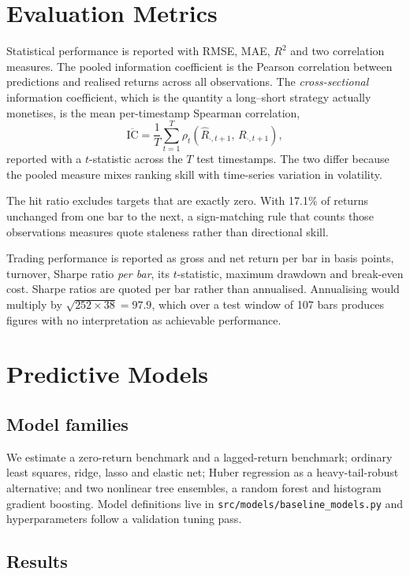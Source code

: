 \documentclass[11pt]{article}
\begin{document}
\section{Evaluation Metrics}
\label{sec:metrics}

Statistical performance is reported with RMSE, MAE, $R^2$ and two correlation
measures. The pooled information coefficient is the Pearson correlation between
predictions and realised returns across all observations. The
\emph{cross-sectional} information coefficient, which is the quantity a
long--short strategy actually monetises, is the mean per-timestamp Spearman
correlation,
\[
\overline{\mathrm{IC}} = \frac{1}{T}\sum_{t=1}^{T}
\rho_t\!\left(\widehat R_{\cdot,t+1},\, R_{\cdot,t+1}\right),
\]
reported with a $t$-statistic across the $T$ test timestamps. The two differ
because the pooled measure mixes ranking skill with time-series variation in
volatility.

The hit ratio excludes targets that are exactly zero. With 17.1\% of
returns unchanged from one bar to the next, a sign-matching rule that counts
those observations measures quote staleness rather than directional skill.

Trading performance is reported as gross and net return per bar in basis
points, turnover, Sharpe ratio \emph{per bar}, its $t$-statistic, maximum
drawdown and break-even cost. Sharpe ratios are quoted per bar rather than
annualised. Annualising would multiply by $\sqrt{252 \times 38} = 97.9$, which
over a test window of 107 bars produces figures with no
interpretation as achievable performance.

\FloatBarrier
\section{Predictive Models}

\subsection{Model families}

We estimate a zero-return benchmark and a lagged-return benchmark; ordinary
least squares, ridge, lasso and elastic net; Huber regression as a
heavy-tail-robust alternative; and two nonlinear tree ensembles, a random
forest and histogram gradient boosting. Model definitions live in
\texttt{src/models/baseline\_models.py} and hyperparameters follow a validation
tuning pass.

\subsection{Results}
\end{document}
